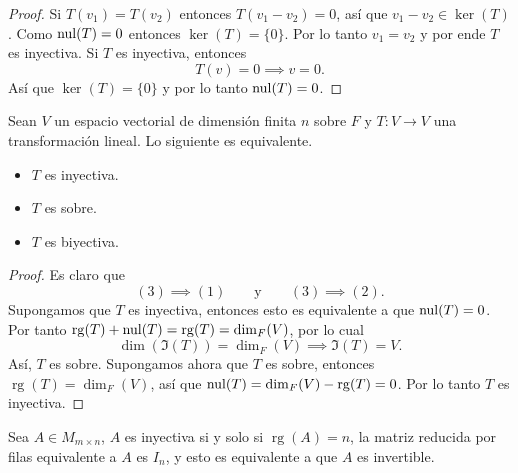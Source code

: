 \documentclass[12pt,a4paper]{book}
\newcommand{\rg}{\operatorname{rg}}
\newcommand{\llaves}[1]{\{#1\}}
\begin{document}
    \begin{proof}
        Si $T(v_{1}) = T(v_{2})$ entonces $T(v_{1} - v_{2}) = 0$, así que $v_{1} - v_{2} \in \ker(T)$. Como $\operatorname{nul}(T) = 0$ entonces $\ker(T) = \llaves{0}$. Por lo tanto $v_{1} = v_{2}$ y por ende $T$ es inyectiva. Si $T$ es inyectiva, entonces
        \begin{equation*}
            T(v) = 0 \implies v = 0.
        \end{equation*}
        Así que $\ker(T) = \llaves{0}$ y por lo tanto $\operatorname{nul}(T) = 0$.
    \end{proof}

    \begin{corolario}
    \label{coro:5}
        Sean $V$ un espacio vectorial de dimensión finita $n$ sobre $F$ y $T: V \to V$ una transformación lineal. Lo siguiente es equivalente.
        \begin{itemize}
            \item[(1)] $T$ es inyectiva.
            \item[(2)] $T$ es sobre.
            \item[(3)] $T$ es biyectiva.
        \end{itemize}
    \end{corolario}
    
    \begin{proof}
        Es claro que
        \begin{equation*}
            (3) \implies (1) \qquad \text{y} \qquad (3) \implies (2).
        \end{equation*}
        Supongamos que $T$ es inyectiva, entonces esto es equivalente a que $\operatorname{nul}(T) = 0$. Por tanto $\rg(T) + \nul(T) = \rg(T) = \dim_{F}(V)$, por lo cual
        \begin{equation*}
            \dim(\Im(T)) = \dim_{F}(V) \implies \Im(T) = V.
        \end{equation*}
        Así, $T$ es sobre. Supongamos ahora que $T$ es sobre, entonces $\rg(T) = \dim_{F}(V)$, así que $\nul(T) = \dim_{F}(V) - \rg(T) = 0$. Por lo tanto $T$ es inyectiva. 
    \end{proof}


    Sea $A \in M_{m \times n}$, $A$ es inyectiva si y solo si $\rg(A) = n$, la matriz reducida por filas equivalente a $A$ es $I_{n}$, y esto es equivalente a que $A$ es invertible.
\end{document}
